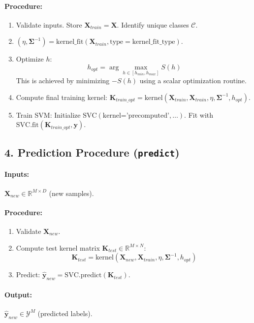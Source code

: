 \documentclass{article}
\newcommand{\mat}[1]{\mathbf{#1}} %
\newcommand{\vecbf}[1]{\bm{#1}} %
\begin{document}
\paragraph{Procedure:}
\begin{enumerate}
    \item Validate inputs. Store $\mat{X}_{train} = \mat{X}$. Identify unique classes $\mathcal{C}$.
    \item $(\eta, \mat{\Sigma}^{-1}) = \text{kernel\_fit}(\mat{X}_{train}, \text{type}=\text{kernel\_fit\_type})$.
    \item Optimize $h$:
    $$h_{opt} = \arg\max_{h \in [h_{min}, h_{max}]} S(h)$$
    This is achieved by minimizing $-S(h)$ using a scalar optimization routine.
    \item Compute final training kernel: $\mat{K}_{train\_opt} = \text{kernel}(\mat{X}_{train}, \mat{X}_{train}, \eta, \mat{\Sigma}^{-1}, h_{opt})$.
    \item Train SVM: Initialize $\text{SVC}(\text{kernel='precomputed'}, \dots)$. Fit with $\text{SVC.fit}(\mat{K}_{train\_opt}, \vecbf{y})$.
\end{enumerate}

\subsection*{4. Prediction Procedure (\texttt{predict})}
\paragraph{Inputs:} $\mat{X}_{new} \in \mathbb{R}^{M \times D}$ (new samples).
\paragraph{Procedure:}
\begin{enumerate}
    \item Validate $\mat{X}_{new}$.
    \item Compute test kernel matrix $\mat{K}_{test} \in \mathbb{R}^{M \times N}$:
    $$\mat{K}_{test} = \text{kernel}(\mat{X}_{new}, \mat{X}_{train}, \eta, \mat{\Sigma}^{-1}, h_{opt})$$
    \item Predict: $\hat{\vecbf{y}}_{new} = \text{SVC.predict}(\mat{K}_{test})$.
\end{enumerate}
\paragraph{Output:} $\hat{\vecbf{y}}_{new} \in \mathcal{Y}^M$ (predicted labels).
\end{document}
